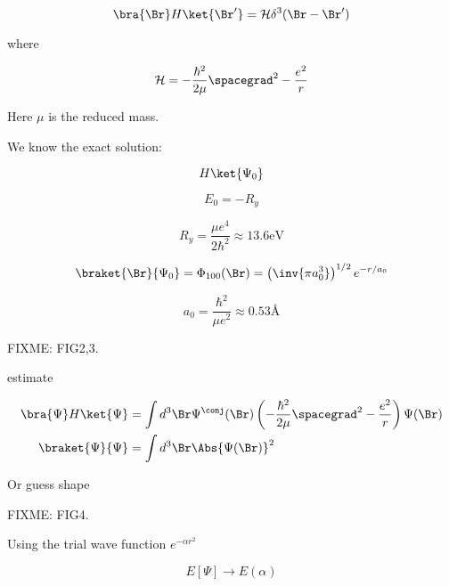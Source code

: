 \begin{equation}\label{eqn:qmTwoL2:210}
\bra{\Br} H \ket{\Br'} = \mathcal{H} \delta^3(\Br - \Br')
\end{equation}

where

\begin{equation}\label{eqn:qmTwoL2:230}
\mathcal{H} = -\frac{\hbar^2}{2 \mu} \spacegrad^2 - \frac{e^2}{r}
\end{equation}

Here $\mu$ is the reduced mass.

We know the exact solution:

\begin{equation}\label{eqn:qmTwoL2:250}
H \ket{\Psi_0}
\end{equation}

\begin{equation}\label{eqn:qmTwoL2:270}
E_0 = -R_y
\end{equation}

\begin{equation}\label{eqn:qmTwoL2:290}
R_y = \frac{\mu e^4}{2 \hbar^2} \approx 13.6 \text{eV}
\end{equation}

\begin{equation}\label{eqn:qmTwoL2:310}
\braket{\Br}{\Psi_0} = \Phi_{100}(\Br) = \left( \inv{\pi a_0^3}\right)^{1/2} e^{-r/a_0}
\end{equation}

\begin{equation}\label{eqn:qmTwoL2:330}
a_0 = \frac{\hbar^2}{\mu e^2} \approx 0.53 \text{\AA}
\end{equation}

FIXME: FIG2,3.

estimate

\begin{align}\label{eqn:qmTwoL2:350}
\bra{\Psi} H \ket{\Psi} &= \int d^3 \Br \Psi^\conj(\Br) \left( -\frac{\hbar^2}{2 \mu} \spacegrad^2 - \frac{e^2}{r} \right) \Psi(\Br) \\
\braket{\Psi}{\Psi} &= \int d^3 \Br \Abs{\Psi(\Br)}^2
\end{align}

Or guess shape

FIXME: FIG4.

Using the trial wave function $e^{-\alpha r^2}$

\begin{equation}\label{eqn:qmTwoL2:370}
E[\Psi] \rightarrow E(\alpha)
\end{equation}

